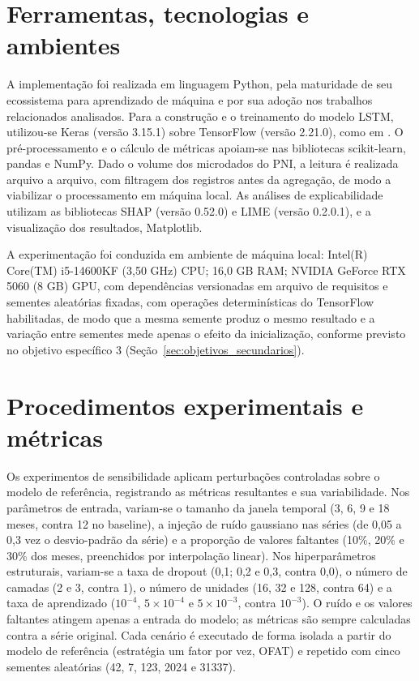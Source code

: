 \documentclass[
    12pt,
    openright,
    oneside,
    a4paper,
    english,
    brazil
]{abntex2}
\begin{document}
\section{Ferramentas, tecnologias e ambientes}
\label{subsec:tecnologias}

A implementação foi realizada em linguagem Python, pela maturidade de seu ecossistema para aprendizado de máquina e por sua adoção nos trabalhos relacionados analisados. Para a construção e o treinamento do modelo LSTM, utilizou-se Keras (versão 3.15.1) sobre TensorFlow (versão 2.21.0), como em . O pré-processamento e o cálculo de métricas apoiam-se nas bibliotecas scikit-learn, pandas e NumPy. Dado o volume dos microdados do PNI, a leitura é realizada arquivo a arquivo, com filtragem dos registros antes da agregação, de modo a viabilizar o processamento em máquina local. As análises de explicabilidade utilizam as bibliotecas SHAP (versão 0.52.0) e LIME (versão 0.2.0.1), e a visualização dos resultados, Matplotlib.

A experimentação foi conduzida em ambiente de máquina local: Intel(R) Core(TM) i5-14600KF (3,50 GHz) CPU; 16,0 GB RAM; NVIDIA GeForce RTX 5060 (8 GB) GPU, com dependências versionadas em arquivo de requisitos e sementes aleatórias fixadas, com operações determinísticas do TensorFlow habilitadas, de modo que a mesma semente produz o mesmo resultado e a variação entre sementes mede apenas o efeito da inicialização, conforme previsto no objetivo específico 3 (Seção~\ref{sec:objetivos_secundarios}).

\section{Procedimentos experimentais e métricas}
\label{sec:proc_experimentais}

Os experimentos de sensibilidade aplicam perturbações controladas sobre o modelo de referência, registrando as métricas resultantes e sua variabilidade. Nos parâmetros de entrada, variam-se o tamanho da janela temporal (3, 6, 9 e 18 meses, contra 12 no baseline), a injeção de ruído gaussiano nas séries (de 0,05 a 0,3 vez o desvio-padrão da série) e a proporção de valores faltantes (10\%, 20\% e 30\% dos meses, preenchidos por interpolação linear). Nos hiperparâmetros estruturais, variam-se a taxa de dropout (0,1; 0,2 e 0,3, contra 0,0), o número de camadas (2 e 3, contra 1), o número de unidades (16, 32 e 128, contra 64) e a taxa de aprendizado ($10^{-4}$, $5\times10^{-4}$ e $5\times10^{-3}$, contra $10^{-3}$). O ruído e os valores faltantes atingem apenas a entrada do modelo; as métricas são sempre calculadas contra a série original. Cada cenário é executado de forma isolada a partir do modelo de referência (estratégia um fator por vez, OFAT) e repetido com cinco sementes aleatórias (42, 7, 123, 2024 e 31337).
\end{document}
